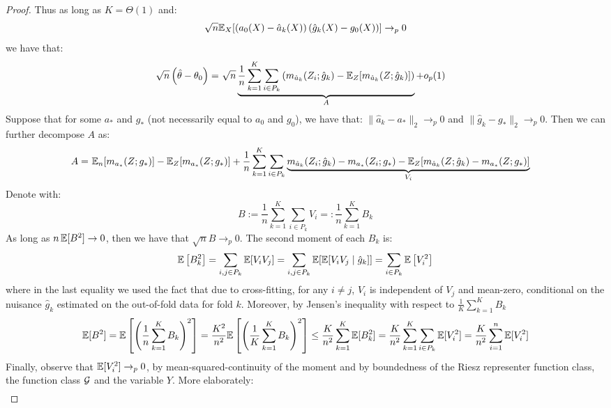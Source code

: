\begin{proof}
Thus as long as $K=\Theta(1)$ and:
\begin{equation}
    \sqrt{n} \mathbb{E}_X[(a_0(X) - \hat{a}_k(X))\, (\hat{g}_k(X) - g_0(X))] \rightarrow_p 0
\end{equation}
we have that:
\begin{align}
    \sqrt{n}\left(\hat{\theta}-\theta_0\right) =~& \sqrt{n} \underbrace{\frac{1}{n} \sum_{k=1}^K \sum_{i\in P_k} \left(m_{\hat{a}_k}(Z_i; \hat{g}_k) - \mathbb{E}_Z[m_{\hat{a}_k}(Z; \hat{g}_k)]\right)}_{A} + o_p(1)
\end{align}
Suppose that for some $a_*$ and $g_*$ (not necessarily equal to $a_0$ and $g_0$), we have that: $\|\hat{a}_k-a_*\|_2 \to_p 0$ and $\|\hat{g}_k-g_*\|_2\to_p 0$. Then we can further decompose $A$ as:
\begin{align}
    A =~& \mathbb{E}_n[m_{a_*}(Z; g_*)] - \mathbb{E}_Z[m_{a_*}(Z; g_*)] + \frac{1}{n} \sum_{k=1}^K \sum_{i\in P_k} \underbrace{m_{\hat{a}_k}(Z_i; \hat{g}_k) - m_{a_*}(Z_i; g_*) - \mathbb{E}_Z[m_{\hat{a}_k}(Z; \hat{g}_k) - m_{a_*}(Z; g_*)]}_{V_i}
\end{align}
Denote with: 
\begin{equation}
    B := \frac{1}{n}\sum_{k=1}^K \sum_{i\in P_k} V_i =: \frac{1}{n} \sum_{k=1}^{K} B_k
\end{equation}
As long as $n\,\mathbb{E}[B^2]\to 0$, then we have that $\sqrt{n} B \to_p 0$. The second moment of each $B_k$ is:
\begin{equation}
    \mathbb{E}\left[B_k^2\right] = \sum_{i, j\in P_k} \mathbb{E}[V_i V_j] = \sum_{i, j\in P_k} \mathbb{E}[\mathbb{E}[V_i V_j \mid \hat{g}_k]] = \sum_{i\in P_k} \mathbb{E}\left[V_i^2\right] 
\end{equation}
where in the last equality we used the fact that due to cross-fitting, for any $i\neq j$, $V_i$ is independent of $V_j$ and mean-zero, conditional on the nuisance $\hat{g}_k$ estimated on the out-of-fold data for fold $k$. 
Moreover, by Jensen's inequality with respect to $\frac{1}{K}\sum_{k=1}^K B_k$
\begin{equation}
    \mathbb{E}[B^2] = \mathbb{E}\left[\left(\frac{1}{n} \sum_{k=1}^K B_k\right)^2\right] = \frac{K^2}{n^2} \mathbb{E}\left[\left(\frac{1}{K} \sum_{k=1}^K B_k\right)^2\right] \leq \frac{K}{n^2} \sum_{k=1}^K \mathbb{E}[B_k^2] = \frac{K}{n^2} \sum_{k=1}^K \sum_{i\in P_k} \mathbb{E}[V_i^2] = \frac{K}{n^2} \sum_{i=1}^n \mathbb{E}[V_i^2]
\end{equation}
Finally, observe that $\mathbb{E}[V_i^2] \to_p 0$, by mean-squared-continuity of the moment and by boundedness of the Riesz representer function class, the function class ${\mathcal G}$ and the variable $Y$. More elaborately:
\begin{align}

\end{align}
\end{proof}
